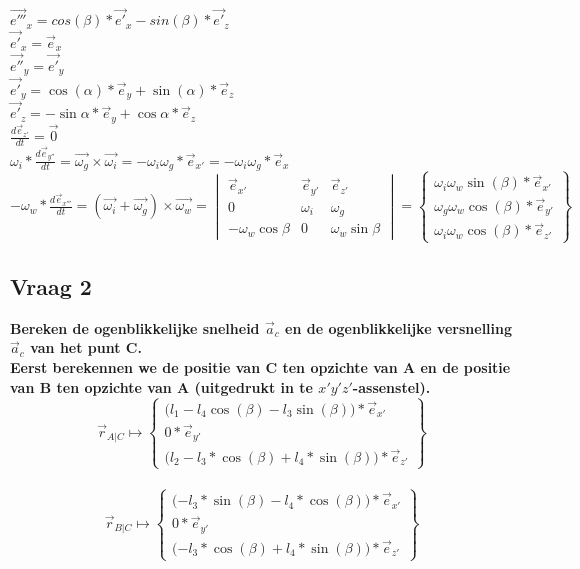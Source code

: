 \documentclass[a4paper,10pt]{article}
\begin{document}
\begin{center}
	$\vec{e'''}_{x} = cos(\beta) *\vec{e'}_{x} - sin(\beta) *\vec{e'}_{z}$\\
	$\vec{e'}_{x}=\vec{e}_{x}$\\
	$\vec{e''}_{y} = \vec{e'}_{y} $\\
	$\vec{e'}_{y} = \cos(\alpha)*\vec{e}_{y} + \sin(\alpha)*\vec{e}_z $\\
	$\vec{e'}_{z} = -\sin{\alpha}*\vec{e}_{y} + \cos{\alpha}*\vec{e}_z $\\
	$\frac{d\vec{e}_{z'}}{dt}=\vec{0}$\\
	$\omega_i * \frac{d\vec{e}_{y''}}{dt}=\vec{\omega_g}\times\vec{\omega_i} = -\omega_i \omega_g *\vec{e}_{x'} = -\omega_i \omega_g *\vec{e}_{x}  $\\
	$-\omega_w * \frac{d\vec{e}_{x'''}}{dt} = (\vec{\omega_i} + \vec{\omega_g})\times\vec{\omega_w} = \begin{vmatrix}
	\vec{e}_{x'}&\vec{e}_{y'}&\vec{e}_{z'}\\
	0 & \omega_i & \omega_g\\
	-\omega_w \cos{\beta} & 0 & \omega_w \sin{\beta}
	\end{vmatrix} = \begin{Bmatrix}
	\omega_i \omega_w \sin(\beta)  *\vec{e}_{x'} \\
	\omega_g \omega_w \cos(\beta) *\vec{e}_{y'}\\
	\omega_i \omega_w \cos(\beta) *\vec{e}_{z'}
	\end{Bmatrix}
	$
\end{center}
\subsection{Vraag 2}
\textbf{Bereken de ogenblikkelijke snelheid $\vec{a}_c$ en de ogenblikkelijke versnelling $\vec{a}_c$ van het punt C.}\\
\textbf{Eerst berekennen we de positie van C ten opzichte van A en de positie van B ten opzichte van A (uitgedrukt in te $x'y'z'$-assenstel).}
\begin{equation}
	\vec{r}_{A|C} \mapsto \begin{Bmatrix}
		\Big({l_1 - l_4 \cos(\beta)-l_3 \sin(\beta)\Big)*\vec{e}_{x'}}\\
		0 * \vec{e}_{y'}\\
		\Big ({l_2 - l_3*\cos(\beta) + l_4 *\sin(\beta)\Big) * \vec{e}_{z'}}
	\end{Bmatrix}
\end{equation}\\
\begin{equation}
	\vec{r}_{B|C} \mapsto \begin{Bmatrix}
		\Big({ - l_3 * \sin(\beta) - l_4 * \cos(\beta)\Big)*\vec{e}_{x'}}\\
		0 * \vec{e}_{y'}\\
		\Big ({ - l_3*\cos(\beta) + l_4 *\sin(\beta)\Big) * \vec{e}_{z'}}
	\end{Bmatrix}
\end{equation}\\
\end{document}
